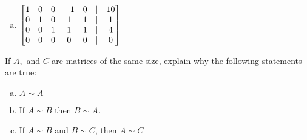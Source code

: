 \begin{prob}
\begin{enumerate}[a)]
\item $ \bmatrix 
1& 0& 0& -1& 0&|& 10\\  
0& 1& 0& 1&1&|& 1\\ 
0& 0& 1& 1& 1&|& 4\\ 
0& 0& 0& 0& 0&|& 0\endbmatrix$
\medskip
%
\end{enumerate}

\end{prob} 

\begin{prob} \label{prob12.3}
If $A, $ and $C$ are matrices of the same size, explain why the following statements are true:

\begin{enumerate}[a)]
\item $A \sim A$
\item If $A \sim B$ then $B \sim A$.
\item If $A \sim B$ and $B \sim C$, then $A \sim C$
\end{enumerate}
\end{prob}  